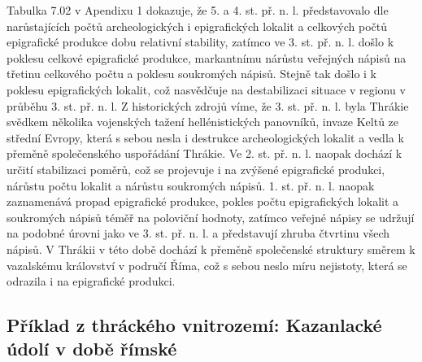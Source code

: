 Tabulka 7.02 v Apendixu 1 dokazuje, že 5. a 4. st. př. n. l. představovalo dle narůstajících počtů archeologických i epigrafických lokalit a celkových počtů epigrafické produkce dobu relativní stability, zatímco ve 3. st. př. n. l. došlo k poklesu celkové epigrafické produkce, markantnímu nárůstu veřejných nápisů na třetinu celkového počtu a poklesu soukromých nápisů. Stejně tak došlo i k poklesu epigrafických lokalit, což nasvědčuje na destabilizaci situace v regionu v průběhu 3. st. př. n. l. Z historických zdrojů víme, že 3. st. př. n. l. byla Thrákie svědkem několika vojenských tažení hellénistických panovníků, invaze Keltů ze střední Evropy, která s sebou nesla i destrukce archeologických lokalit a vedla k přeměně společenského uspořádání Thrákie. Ve 2. st. př. n. l. naopak dochází k určití stabilizaci poměrů, což se projevuje i na zvýšené epigrafické produkci, nárůstu počtu lokalit a nárůstu soukromých nápisů. 1. st. př. n. l. naopak zaznamenává propad epigrafické produkce, pokles počtu epigrafických lokalit a soukromých nápisů téměř na poloviční hodnoty, zatímco veřejné nápisy se udržují na podobné úrovni jako ve 3. st. př. n. l. a představují zhruba čtvrtinu všech nápisů. V Thrákii v této době dochází k přeměně společenské struktury směrem k vazalskému království v područí Říma, což s sebou neslo míru nejistoty, která se odrazila i na epigrafické produkci.

\subsection[příklad-z-thráckého-vnitrozemí-kazanlacké-údolí-v-době-římské]{Příklad z thráckého vnitrozemí: Kazanlacké údolí v době římské}

